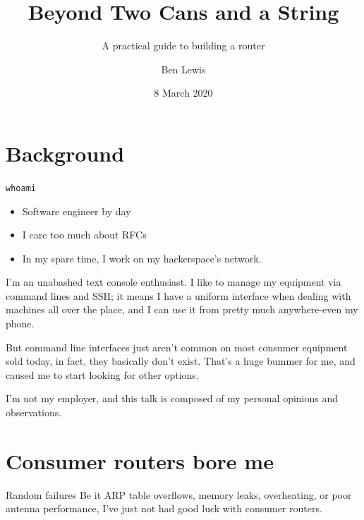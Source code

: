 \documentclass[bigger,aspectratio=169]{beamer}
\author{Ben Lewis}
\date{8 March 2020}
\title{Beyond Two Cans and a String}
\subtitle{A practical guide to building a router}
\begin{document}
\maketitle

\section{Background}
\label{sec:orgb37081c}

\begin{frame}[fragile,label={sec:org06c16c6}]{\texttt{whoami}}
  \begin{itemize}
  \item Software engineer by day
  \item I care too much about RFCs
  \item In my spare time, I work on my hackerspace's network.
  \end{itemize}
\begin{notes}
I'm an unabashed text console enthusiast. I like to manage my equipment via
command lines and SSH; it means I have a uniform interface when dealing with
machines all over the place, and I can use it from pretty much anywhere-even my
phone.

But command line interfaces just aren't common on most consumer equipment sold
today, in fact, they basically don't exist. That's a huge bummer for me, and
caused me to start looking for other options.
\end{notes}
\end{frame}

\begin{frame}
  I'm not my employer, and this talk is composed of my personal opinions and observations.
\end{frame}

\section{Consumer routers bore me}
\label{sec:org769d52d}

\frame{\sectionpage}

\begin{frame}[label={sec:org6db040a}]{Random failures}
Be it ARP table overflows, memory leaks, overheating, or poor antenna
performance, I've just not had good luck with consumer routers.
\end{frame}
\end{document}
